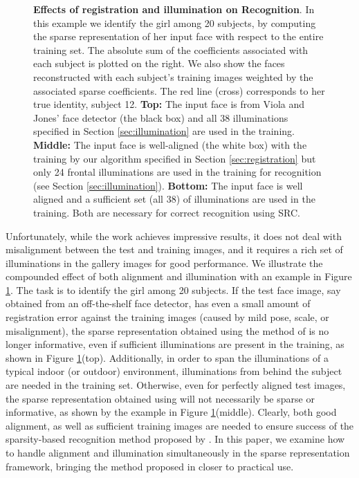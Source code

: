 \documentclass[10pt,journal,letterpaper,compsoc]{IEEEtran} %
\begin{document}
\begin{figure}
\begin{tabular}{cc}
\end{tabular} \caption{{\bf Effects of registration and illumination on
Recognition}. In this example we identify the girl among 20 subjects, by
computing the sparse representation of her input face with respect to the
entire training set. The absolute sum of the coefficients associated with each
subject is plotted on the right. We also show the faces reconstructed with each
subject's training images weighted by the associated sparse coefficients. The
red line (cross) corresponds to her true identity, subject 12. {\bf Top:} The
input face is from Viola and Jones' face detector (the black box) and all 38
illuminations specified in Section \ref{sec:illumination} are used in the
training.  {\bf Middle:} The input face is well-aligned (the white box) with
the training by our algorithm specified in Section \ref{sec:registration} but
only 24 frontal illuminations are used in the training for recognition (see
Section \ref{sec:illumination}). {\bf Bottom:} The input face is well aligned and
a sufficient set (all 38) of
illuminations are used in the training. Both are necessary for correct recognition
using SRC.}\label{fig:promo}
\vspace{-6.9mm}
\end{figure}

Unfortunately, while the work \cite{Wright2009-PAMI} achieves impressive results, it does not deal with misalignment
between the test and training images, and it requires a rich set of illuminations
in the gallery images for good performance.
We illustrate the compounded effect of both alignment and illumination
with an example in Figure \ref{fig:promo}.
The task is to identify the girl among 20 subjects. If the test
face image, say obtained from an off-the-shelf face detector,
has even a small amount of registration error against the
training images (caused by mild pose, scale, or misalignment),
the sparse representation obtained using the method of \cite{Wright2009-PAMI} is no longer informative,
even if sufficient illuminations are present in the training, as shown in Figure
\ref{fig:promo}(top). Additionally, in order to span
the illuminations of a typical indoor (or outdoor) environment,
illuminations from behind the subject are needed in the
training set. Otherwise, even for perfectly aligned test images,
the sparse representation obtained using \cite{Wright2009-PAMI} will not necessarily be sparse or
informative, as shown by the example in Figure
\ref{fig:promo}(middle). Clearly, both good alignment, as well
as sufficient training images are needed to ensure success of the sparsity-based
recognition method proposed by \cite{Wright2009-PAMI}.
In this paper, we examine how to handle alignment and illumination simultaneously
in the sparse representation framework, bringing the method proposed in \cite{Wright2009-PAMI}
closer to practical use.
\end{document}

